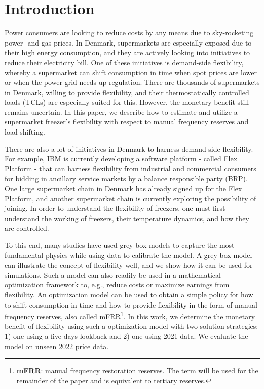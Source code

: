 \section{Introduction}

Power consumers are looking to reduce costs by any means due to sky-rocketing power- and gas prices. In Denmark, supermarkets are especially exposed due to their high energy consumption, and they are actively looking into initiatives to reduce their electricity bill. One of these initiatives is demand-side flexibility, whereby a supermarket can shift consumption in time when spot prices are lower or when the power grid needs up-regulation. There are thousands of supermarkets in Denmark, willing to provide flexibility, and their thermostatically controlled loads (TCLs) are especially suited for this. However, the monetary benefit still remains uncertain. In this paper, we describe how to estimate and utilize a supermarket freezer's flexibility with respect to manual frequency reserves and load shifting.

There are also a lot of initiatives in Denmark to harness demand-side flexibility. For example, IBM is currently developing a software platform - called Flex Platform - that can harness flexibility from industrial and commercial consumers for bidding in ancillary service markets by a balance responsible party (BRP). One large supermarket chain in Denmark has already signed up for the Flex Platform, and another supermarket chain is currently exploring the possibility of joining. In order to understand the flexibility of freezers, one must first understand the working of freezers, their temperature dynamics, and how they are controlled.

To this end, many studies have used grey-box models to capture the most fundamental physics while using data to calibrate the model. A grey-box model can illustrate the concept of flexibility well, and we show how it can be used for simulations. Such a model can also readily be used in a mathematical optimization framework to, e.g., reduce costs or maximize earnings from flexibility. An optimization model can be used to obtain a simple policy for how to shift consumption in time and how to provide flexibility in the form of manual frequency reserves, also called mFRR\footnote{\textbf{mFRR}: manual frequency restoration reserves. The term will be used for the remainder of the paper and is equivalent to tertiary reserves.}. In this work, we determine the monetary benefit of flexibility using such a optimization model with two solution strategies: 1) one using a five days lookback and 2) one using 2021 data. We evaluate the model on unseen 2022 price data.

